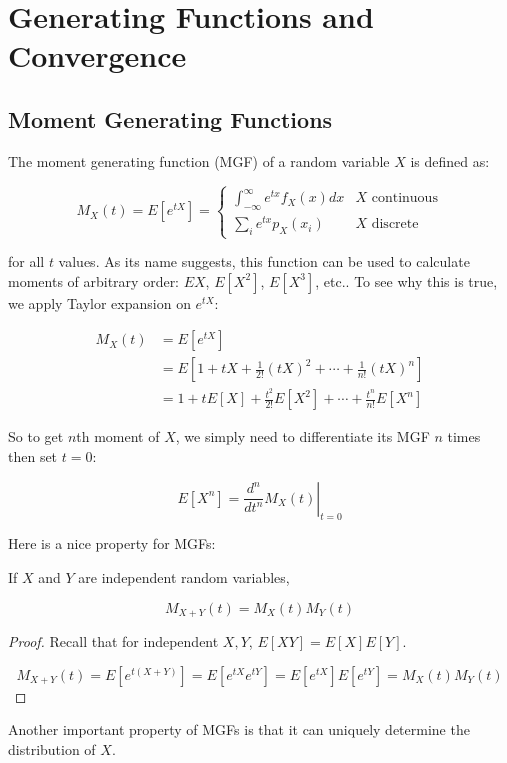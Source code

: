 \section{Generating Functions and Convergence}

\subsection{Moment Generating Functions}

The moment generating function (MGF) of a random variable $X$ is defined as:

\[M_X(t)=E[e^{tX}]=\begin{cases} \displaystyle\int_{-\infty}^\infty e^{tx} f_X(x) dx & \text{$X$ continuous} \\[20pt] \displaystyle\sum_i e^{tx} p_X(x_i) & \text{$X$ discrete} \end{cases}\]

for all $t$ values. As its name suggests, this function can be used to calculate moments of arbitrary order: $EX$, $E[X^2]$, $E[X^3]$, etc.. To see why this is true, we apply Taylor expansion on $e^{tX}$:

\begin{align*}
	M_X(t)&=E[e^{tX}] \\
	&=E\left[ 1+tX+\frac{1}{2!}(tX)^2+\cdots+\frac{1}{n!}(tX)^n \right] \\
	&=1+tE[X]+\frac{t^2}{2!}E[X^2]+\cdots+\frac{t^n}{n!}E[X^n]
\end{align*}

So to get $n$th moment of $X$, we simply need to differentiate its MGF $n$ times then set $t=0$:

\[E[X^n]=\left. \frac{d^n}{dt^n} M_X(t) \right\vert_{t=0}\]

Here is a nice property for MGFs:

\begin{theorem}
	If $X$ and $Y$ are independent random variables,
	
	\[M_{X+Y}(t)=M_X(t)M_Y(t)\]
\end{theorem}
\begin{proof}
	Recall that for independent $X,Y$, $E[XY]=E[X]E[Y]$.
	
	\[M_{X+Y}(t)=E[e^{t(X+Y)}]=E[e^{tX}e^{tY}]=E[e^{tX}]E[e^{tY}]=M_X(t)M_Y(t)\]
\end{proof}

Another important property of MGFs is that it can uniquely determine the distribution of $X$. \\

